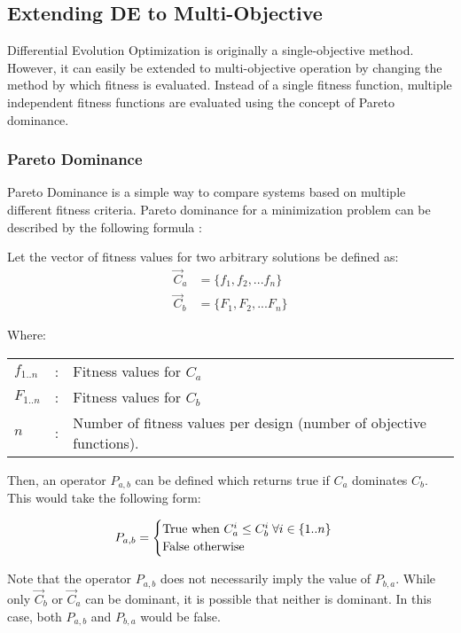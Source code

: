 \subsection{Extending DE to Multi-Objective}
Differential Evolution Optimization is originally a single-objective method. However, it can easily be extended to multi-objective operation by changing the method by which fitness is evaluated. Instead of a single fitness function, multiple independent fitness functions are evaluated using the concept of Pareto dominance. 


\subsubsection{Pareto Dominance}
Pareto Dominance is a simple way to compare systems based on multiple different fitness criteria. Pareto dominance for a minimization problem can be described by the following formula \cite{diff-evol}: 

Let the vector of fitness values for two arbitrary solutions be defined as:
\begin{align*}
	\vec{C}_a &= \{ f_1, f_2, ... f_n \}\\
	\vec{C}_b &= \{ F_1, F_2, ... F_n\}
\end{align*}

Where:
\begin{center}
\begin{tabular}{lcl}
	$f_{1..n}$ & : & Fitness values for $C_a$\\
	$F_{1..n}$ & : & Fitness values for $C_b$\\
	$n$ & : & Number of fitness values per design (number of objective functions). 
\end{tabular}
\end{center}

Then, an operator $P_{a,b}$ can be defined which returns true if $C_a$ dominates $C_b$. This would take the following form:

\begin{equation}\label{eq:dominance}
P_{a,b} = \begin{cases}
          \hbox{True  when  } C_{a}^i \le C_{b}^i \; \forall i \in \{1..n\}\\ 
          \hbox{False otherwise}
          \end{cases}
\end{equation}

Note that the operator $P_{a,b}$ does not necessarily imply the value of $P_{b,a}$. While only $\vec{C}_b$ or $\vec{C}_a$ can be dominant, it is possible that neither is dominant. In this case, both $P_{a,b}$ and $P_{b,a}$ would be false\cite{diff-evol}. 

